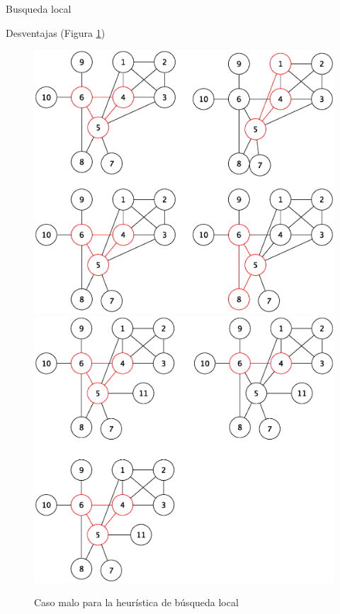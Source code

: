\begin{section}{Busqueda local}
\begin{subsection}{Desventajas}
		(Figura \ref{fig:seguimiento_caso_malo_busqueda_local2})

			\begin{figure}[H]
				\centering
		    	\includegraphics[scale=0.5]{busqueda_local/segCasoMalo2.eps}
			\includegraphics[scale=0.5]{busqueda_local/segCasoMalo2_cont.eps}
			    \caption{Caso malo para la heurística de búsqueda local}
			    \label{fig:seguimiento_caso_malo_busqueda_local2}
			\end{figure}


\end{subsection}
\end{section}
